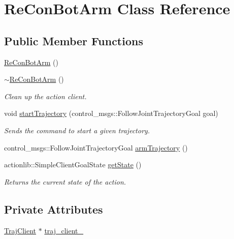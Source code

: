 \hypertarget{class_re_con_bot_arm}{}\section{Re\+Con\+Bot\+Arm Class Reference}
\label{class_re_con_bot_arm}
\subsection*{Public Member Functions}
\begin{DoxyCompactItemize}
\item 
\hyperlink{class_re_con_bot_arm_acdc750bbe5edac6d78c117e0b2073c60}{Re\+Con\+Bot\+Arm} ()
\item 
\hyperlink{class_re_con_bot_arm_ab8ce7d41fb625ac7ad8486278b5e2a45}{$\sim$\+Re\+Con\+Bot\+Arm} ()
\begin{DoxyCompactList}\small\item\em Clean up the action client. \end{DoxyCompactList}\item 
void \hyperlink{class_re_con_bot_arm_a52f6f89615b17a421d5cd8b51b2962d7}{start\+Trajectory} (control\+\_\+msgs\+::\+Follow\+Joint\+Trajectory\+Goal goal)
\begin{DoxyCompactList}\small\item\em Sends the command to start a given trajectory. \end{DoxyCompactList}\item 
control\+\_\+msgs\+::\+Follow\+Joint\+Trajectory\+Goal \hyperlink{class_re_con_bot_arm_ac499ee22d73b90c860f06a16afcd2fb0}{arm\+Trajectory} ()
\item 
actionlib\+::\+Simple\+Client\+Goal\+State \hyperlink{class_re_con_bot_arm_a179480efa62ff256fb8b3ddc0685d762}{get\+State} ()
\begin{DoxyCompactList}\small\item\em Returns the current state of the action. \end{DoxyCompactList}\end{DoxyCompactItemize}
\subsection*{Private Attributes}
\begin{DoxyCompactItemize}
\item 
\hyperlink{basic__arm_8cpp_a6fb8875093261cdc69e54d3ac7d5c301}{Traj\+Client} $\ast$ \hyperlink{class_re_con_bot_arm_a0be83821f776c5ca9874fabbeaa177cf}{traj\+\_\+client\+\_\+}
\end{DoxyCompactItemize}


